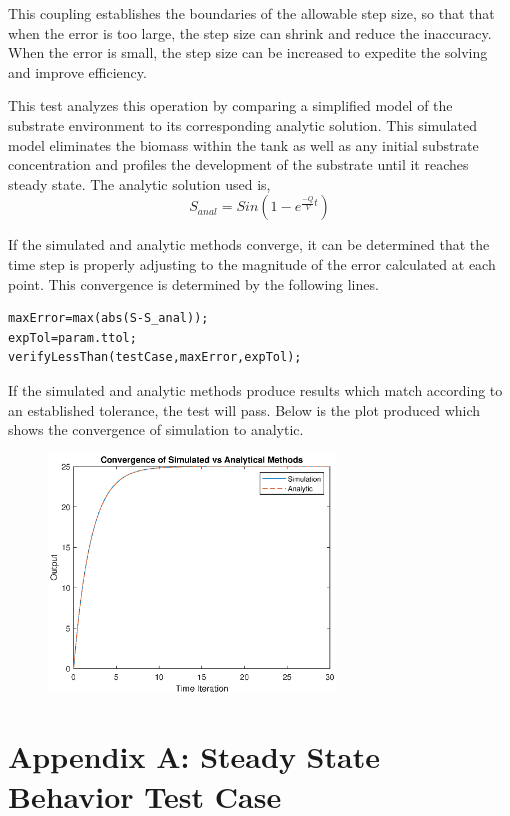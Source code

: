 \documentclass[letterpaper, twoside]{article}
\numberwithin{equation}{section}
\begin{document}
This coupling establishes the boundaries of the allowable step size, so that that when the error is too large, the step size can shrink and reduce the inaccuracy. When the error is small, the step size can be increased to expedite the solving and improve efficiency. 

This test analyzes this operation by comparing a simplified model of the substrate environment to its corresponding analytic solution. This simulated model eliminates the biomass within the tank as well as any initial substrate concentration and profiles the development of the substrate until it reaches steady state. The analytic solution used is,
\begin{equation} \label{eq: S_anal}
  S_{anal}=Sin{(1-e^{\frac{-Q}{V}t})}
\end{equation}

If the simulated and analytic methods converge, it can be determined that the time step is properly adjusting to the magnitude of the error calculated at each point. This convergence is determined by the following lines.

\begin{lstlisting}
maxError=max(abs(S-S_anal));
expTol=param.ttol;
verifyLessThan(testCase,maxError,expTol);
\end{lstlisting}

If the simulated and analytic methods produce results which match according to an established tolerance, the test will pass. Below is the plot produced which shows the convergence of simulation to analytic.

\begin{figure}[H]
  \centering
  \includegraphics[read=eps, width=3in]{TimeDynamics_Figure.eps}
\end{figure}

\section{Appendix A: Steady State Behavior Test Case}\label{Steady State}
\end{document}
